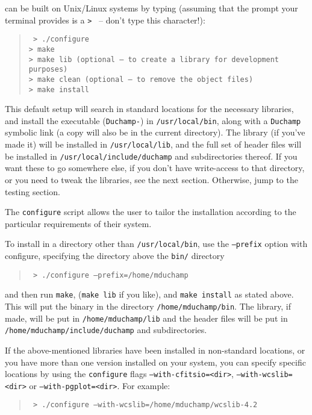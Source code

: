 
\duchamp can be built on Unix/Linux systems by typing (assuming that
the prompt your terminal provides is a \texttt{> } -- don't type this
character!):
\begin{quote}
{\footnotesize
\texttt{%
> ./configure\\
> make\\
> make lib (optional -- to create a library for development
purposes)\\ 
> make clean (optional -- to remove the object files)\\
> make install }
}
\end{quote}

This default setup will search in standard locations for the necessary
libraries, and install the executable (\texttt{Duchamp-\version})
in \texttt{/usr/local/bin}, along with a \texttt{Duchamp} symbolic
link (a copy will also be in the current directory). The library (if
you've made it) will be installed in \texttt{/usr/local/lib}, and the
full set of header files will be installed in
\texttt{/usr/local/include/duchamp} and subdirectories thereof.  If
you want these to go somewhere else, \eg if you don't have
write-access to that directory, or you need to tweak the libraries,
see the next section. Otherwise, jump to the testing section.


The \texttt{configure} script allows the user to tailor the
installation according to the particular requirements of their
system. 

To install \duchamp in a directory other than \texttt{/usr/local/bin},
use the \texttt{--prefix} option with configure, specifying the
directory above the \texttt{bin/} directory \eg
\begin{quote}
{\footnotesize
\texttt{%
> ./configure --prefix=/home/mduchamp}
}
\end{quote}
and then run \texttt{make}, (\texttt{make lib} if you like), and
\texttt{make install} as stated above. This will put the binary in the
directory \texttt{/home/mduchamp/bin}. The library, if made, will be
put in \texttt{/home/mduchamp/lib} and the header files will be put in
\texttt{/home/mduchamp/include/duchamp} and subdirectories.

If the above-mentioned libraries have been installed in non-standard
locations, or you have more than one version installed on your system,
you can specify specific locations by using the \texttt{configure} flags
\texttt{--with-cfitsio=<dir>}, \texttt{--with-wcslib=<dir>} or
\texttt{--with-pgplot=<dir>}. For example:
\begin{quote}
{\footnotesize
\texttt{%
> ./configure --with-wcslib=/home/mduchamp/wcslib-4.2}
}
\end{quote}

